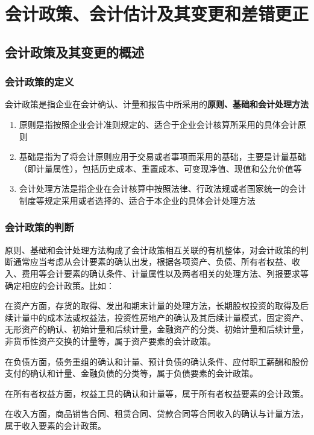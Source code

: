 \documentclass[UTF8,12pt]{ctexart}
\numberwithin{equation}{section} %
\numberwithin{figure}{section}
\numberwithin{table}{section}
\begin{document}
	\section{会计政策、会计估计及其变更和差错更正}
	
	\subsection{会计政策及其变更的概述}
	\subsubsection{会计政策的定义}
	会计政策是指企业在会计确认、计量和报告中所采用的\textbf{原则、基础和会计处理方法}
	\begin{enumerate}
		\item 原则是指按照企业会计准则规定的、适合于企业会计核算所采用的具体会计原则
		
		\item 基础是指为了将会计原则应用于交易或者事项而采用的基础，主要是计量基础（即计量属性），包括历史成本、重置成本、可变现净值、现值和公允价值等
		
		\item 会计处理方法是指企业在会计核算中按照法律、行政法规或者国家统一的会计制度等规定采用或者选择的、适合于本企业的具体会计处理方法
	\end{enumerate}
	
	\subsubsection{会计政策的判断}
	原则、基础和会计处理方法构成了会计政策相互关联的有机整体，对会计政策的判断通常应当考虑从会计要素的确认出发，根据各项资产、负债、所有者权益、收入、费用等会计要素的确认条件、计量属性以及两者相关的处理方法、列报要求等确定相应的会计政策。比如：
	
	在资产方面，存货的取得、发出和期末计量的处理方法，长期股权投资的取得及后续计量中的成本法或权益法，投资性房地产的确认及其后续计量模式，固定资产、无形资产的确认、初始计量和后续计量，金融资产的分类、初始计量和后续计量，非货币性资产交换的计量等，属于资产要素的会计政策。
	
	在负债方面，债务重组的确认和计量、预计负债的确认条件、应付职工薪酬和股份支付的确认和计量、金融负债的分类等，属于负债要素的会计政策。
	
	在所有者权益方面，权益工具的确认和计量等，属于所有者权益要素的会计政策。
	
	在收入方面，商品销售合同、租赁合同、贷款合同等合同收入的确认与计量方法，属于收入要素的会计政策。
	
\end{document}
